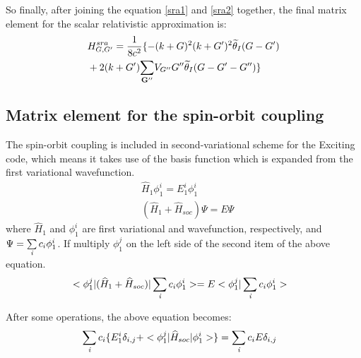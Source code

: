 \documentclass[a4paper]{report}
\begin{document}
\noindent So finally, after joining the equation \ref{sra1} and \ref{sra2} together, the final matrix element for the scalar relativistic approximation is:
\begin{equation}\label{sra4}
\begin{split}
 & H_{G,G'}^{sra} = \frac{1}{{8 {c}^2 }} \{ -(k+G)^2(k+G')^2 \widetilde{\theta}_{I}(G-G') \\
 & + 2{(k+G') \sumg<G''> V_{G''}G''} \widetilde{\theta}_{I}(G-G'-G'') \}
\end{split}
\end{equation}




\subsection{Matrix element for the spin-orbit coupling }
\noindent The spin-orbit coupling is included in second-variational scheme for the Exciting code, 
\noindent  which means it takes use of the basis function which is expanded from the first variational wavefunction.
\begin{equation}
\begin{split}
 & \widehat{H}_{1}   \phi^{i}_{1}  = E^{i}_1  \phi^{i}_{1} \\
 & (\widehat{H}_1+\widehat{H}_{soc})  \Psi  = E \Psi
\end{split}
\end{equation}
\noindent  where $ \widehat{H}_{1}$ and $ \phi^{i}_{1}$ are first variational \hm and wavefunction, respectively, and $\Psi = \sumi<i> c_{i} \phi^{i}_1$.
If  multiply $\phi^{j}_{1}$ on the left side of the second item of the above equation.
\begin{equation}
\begin{split}
 & <  \phi^{j}_1 |(\widehat{H}_1+\widehat{H}_{soc}) | \sumi<i> c_{i} \phi^{i}_1 > = E< \phi^{j}_1 | \sumi<i> c_{i} \phi^{i}_1>
\end{split}
\end{equation}

\noindent After some operations, the above equation becomes:
\begin{equation}
\begin{split}
 &\sumi<i> c_{i} \{ E^{i}_{1} \delta_{i,j} +<\phi^{j}_1 |\widehat{H}_{soc} | \phi^{i}_1  > \} = \sumi<i> c_{i} E \delta_{i,j}
\end{split}
\end{equation}
 
\end{document}
